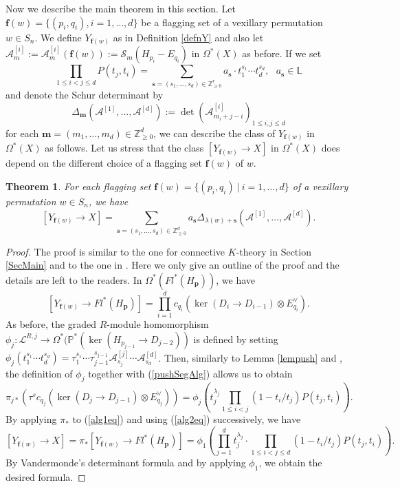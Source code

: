 \documentclass[12pt, reqno,sumlimits]{amsart}
\newtheorem{thm}{Theorem}[section]
\theoremstyle{definition}
\numberwithin{equation}{section}
\newcommand{\LL}{{\mathbb L}}
\newcommand{\PP}{{\mathbb P}}
\newcommand{\ZZ}{{\mathbb Z}}
\newcommand{\bfm}{{\mathbf m }}
\newcommand{\bff}{{\mathbf f }}
\newcommand{\bfp}{{\mathbf p}}
\newcommand{\bfs}{{\mathbf s}}
\newcommand{\calL}{{\mathcal L}}
\newcommand{\scA}{{\mathscr A}}
\newcommand{\scS}{{\mathscr S}}
\newcommand{\Fl}{{Fl}}
\newcommand{\id}{{\operatorname{id}}}
\begin{document}
Now we describe the main theorem in this section. Let $\bff(w)=\{(p_i,q_i), i=1,\dots, d\}$ be a flagging set of a vexillary permutation $w\in S_n$. We define $Y_{\bff(w)}$ as in Definition \ref{defnY} and also let $\scA_{m}^{[i]}:=\scA_{m}^{[i]}(\bff(w)):=\scS_{m}(H_{p_i}-E_{q_i})$ in $\Omega^*(X)$ as before. If we set 
\[
\prod_{1\leq i<j\leq d}P(t_j,t_i)=\sum_{\bfs=(s_1,\dots, s_d) \in\ZZ_{\geq 0}^r}a_{\bfs}\cdot t_1^{s_1}\cdots t_d^{s_d}, \ \ \ a_{\bfs} \in \LL
\]
and denote the Schur determinant by 
\[
\Delta_{\bfm}(\scA^{[1]}, \dots, \scA^{[d]}) := \det\left(\scA_{m_i+j-i}^{[i]}\right)_{1\leq i,j\leq d}
\]
for each $\bfm=(m_1,\dots,m_d) \in \ZZ^d_{\geq 0}$, we can describe the class of $Y_{\bff(w)}$ in $\Omega^*(X)$ as follows. Let us stress that the class $[Y_{\bff(w)} \to X]$ in $\Omega^*(X)$ does depend on the different choice of a flagging set $\bff(w)$ of $w$. %
\begin{thm}\label{thmMainAALG}
For each flagging set $\bff(w)=\{(p_i,q_i) \ |\ i=1,\dots, d\}$ of a vexillary permutation $w\in S_n$, we have
\[
[Y_{\bff(w)} \to X] = \sum_{\bfs=(s_1,\dots, s_d) \in\ZZ^d_{\geq 0}}a_{\bfs} \Delta_{\lambda(w)+\bfs}(\scA^{[1]}, \dots, \scA^{[d]}). 
\]
\end{thm}
\begin{proof}
The proof is similar to the one for connective $K$-theory in Section \ref{SecMain} and to the one in \cite{HudsonMatsumura}. Here we only give an outline of the proof and the details are left to the readers. In $\Omega^*(\Fl^*(H_{\bfp}))$, we have
\begin{equation}\label{alg1eq}
[Y_{\bff(w)} \to \Fl^*(H_{\bfp})] = \prod_{i=1}^d c_{q_i}(\ker(D_i \to D_{i-1}) \otimes E_{q_i}^{\vee}).
\end{equation}
As before, the graded $R$-module homomorphism $\phi_j: \calL^{R,j} \to \Omega^*(\PP^*(\ker(H_{p_{j-1}} \to D_{j-2}))$ is defined by setting $\phi_j( t_1^{s_1}\cdots  t_d^{s_d})= \tau_1^{s_1}\cdots \tau_{j-1}^{s_{j-1}}\scA_{s_j}^{[j]}\cdots \scA_{s_d}^{[d]}$. Then, similarly to Lemma \ref{lempush} and \cite[Lemma 4.6]{HudsonMatsumura}, the definition of $\phi_j$ together with (\ref{pushSegAlg}) allows us to obtain
\begin{equation}\label{alg2eq}
\pi_{j*}(\tau^sc_{q_j}(\ker(D_j \to D_{j-1}) \otimes E_{q_j}^{\vee})) =  \phi_j\left(t_j^{\lambda_j} \prod_{1\leq i< j} (1 - t_i/t_j)P(t_j, t_i) \right).
\end{equation}
By applying $\pi_*$ to (\ref{alg1eq}) and using (\ref{alg2eq}) successively, we have
\[
[Y_{\bff(w)} \to X]=\pi_*[Y_{\bff(w)} \to \Fl^*(H_{\bfp})] = \phi_1\left(\prod_{j=1}^d t_j^{\lambda_j} \cdot \prod_{1\leq i< j\leq d} (1 - t_i/t_j)P(t_j,t_i)\right).
\]
By Vandermonde's determinant formula and by applying $\phi_1$, we obtain the desired formula.
\end{proof}
\end{document}
